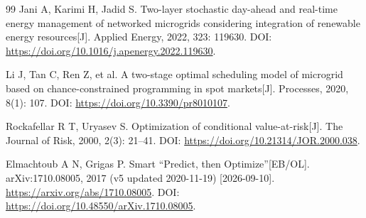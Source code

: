 \begin{thebibliography}{99}
Jani A, Karimi H, Jadid S.
Two-layer stochastic day-ahead and real-time energy management of networked microgrids considering integration of renewable energy resources[J].
Applied Energy, 2022, 323: 119630.
DOI: \url{https://doi.org/10.1016/j.apenergy.2022.119630}.

Li J, Tan C, Ren Z, et al.
A two-stage optimal scheduling model of microgrid based on chance-constrained programming in spot markets[J].
Processes, 2020, 8(1): 107.
DOI: \url{https://doi.org/10.3390/pr8010107}.

Rockafellar R T, Uryasev S.
Optimization of conditional value-at-risk[J].
The Journal of Risk, 2000, 2(3): 21--41.
DOI: \url{https://doi.org/10.21314/JOR.2000.038}.

Elmachtoub A N, Grigas P.
Smart ``Predict, then Optimize''[EB/OL].
arXiv:1710.08005, 2017 (v5 updated 2020-11-19) [2026-09-10].
\url{https://arxiv.org/abs/1710.08005}.
DOI: \url{https://doi.org/10.48550/arXiv.1710.08005}.

\end{thebibliography}
